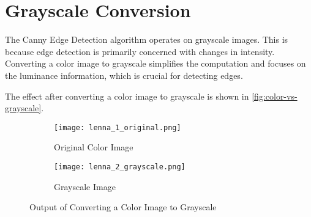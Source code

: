 \section{Grayscale Conversion}
\label{sec:grayscale-conversion}

The Canny Edge Detection algorithm operates on grayscale images. This is because edge detection is primarily concerned with changes in intensity. Converting a color image to grayscale simplifies the computation and focuses on the luminance information, which is crucial for detecting edges.

The effect after converting a color image to grayscale is shown in \autoref{fig:color-vs-grayscale}.

\begin{figure}[ht]
    \centering
    \begin{subfigure}[b]{0.4\textwidth}
        \centering
        \texttt{[image: lenna\_1\_original.png]}
        \caption{Original Color Image}
        \label{fig:lena-color}
    \end{subfigure}
    \hfill
    \begin{subfigure}[b]{0.4\textwidth}
        \centering
        \texttt{[image: lenna\_2\_grayscale.png]}
        \caption{Grayscale Image}
        \label{fig:lena-grayscale}
    \end{subfigure}
    \caption{Output of Converting a Color Image to Grayscale}
    \label{fig:color-vs-grayscale}
\end{figure}